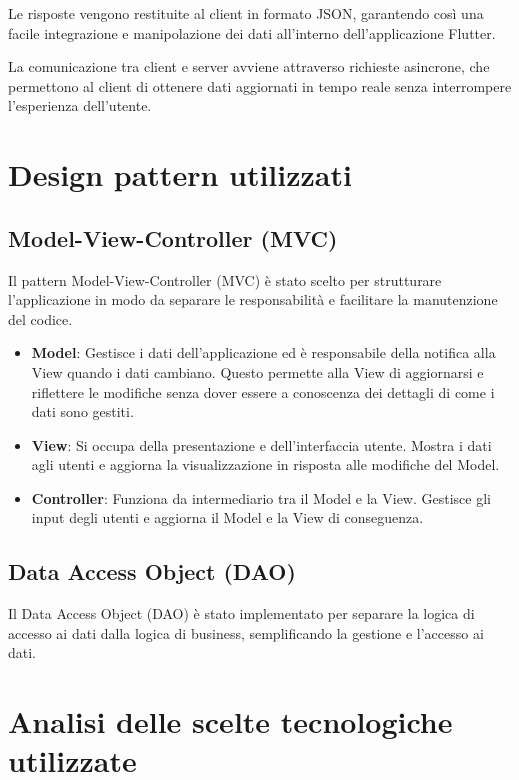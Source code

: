 Le risposte vengono restituite al client in formato JSON, garantendo così una facile integrazione e manipolazione dei dati all'interno dell'applicazione Flutter. 

La comunicazione tra client e server avviene attraverso richieste asincrone, che permettono al client di ottenere dati aggiornati in tempo reale senza interrompere l'esperienza dell'utente.

\section{Design pattern utilizzati}

\subsection{Model-View-Controller (MVC)}
Il pattern Model-View-Controller (MVC) è stato scelto per strutturare l'applicazione in modo da separare le responsabilità e facilitare la manutenzione del codice.

\begin{itemize}
	\item \textbf{Model}: Gestisce i dati dell'applicazione ed è responsabile della notifica alla View quando i dati cambiano. Questo permette alla View di aggiornarsi e riflettere le modifiche senza dover essere a conoscenza dei dettagli di come i dati sono gestiti.

	\item \textbf{View}: Si occupa della presentazione e dell'interfaccia utente. Mostra i dati agli utenti e aggiorna la visualizzazione in risposta alle modifiche del Model.

    \item \textbf{Controller}: Funziona da intermediario tra il Model e la View. Gestisce gli input degli utenti e aggiorna il Model e la View di conseguenza.
\end{itemize}

\subsection{Data Access Object (DAO)}
Il Data Access Object (DAO) è stato implementato per separare la logica di accesso ai dati dalla logica di business, semplificando la gestione e l'accesso ai dati.

\newpage

\section{Analisi delle scelte tecnologiche utilizzate}
